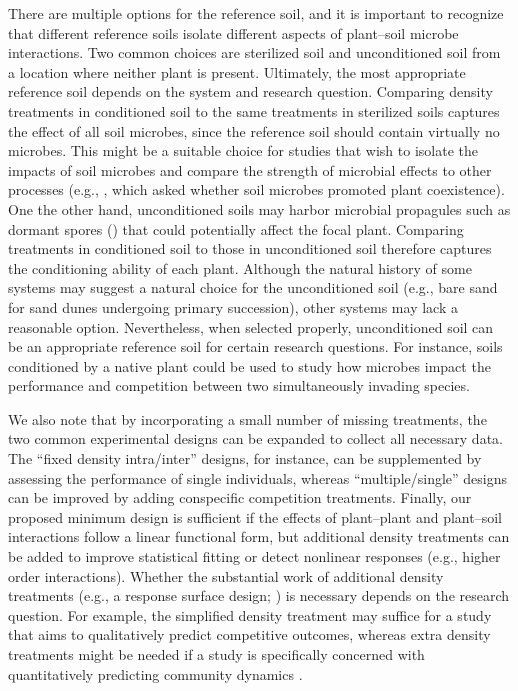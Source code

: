 There are multiple options for the reference soil, and it is important to recognize that different reference soils isolate different aspects of plant--soil microbe interactions. Two common choices are sterilized soil and unconditioned soil from a location where neither plant is present. Ultimately, the most appropriate reference soil depends on the system and research question.
Comparing density treatments in conditioned soil to the same treatments in sterilized soils captures the effect of all soil microbes, since the reference soil should contain virtually no microbes. This might be a suitable choice for studies that wish to isolate the impacts of soil microbes and compare the strength of microbial effects to other processes (e.g., \citealp{Chung2016}, which asked whether soil microbes promoted plant coexistence).
One the other hand, unconditioned soils may harbor microbial propagules such as dormant spores (\citealp{Lennon2011}) that could potentially affect the focal plant. Comparing treatments in conditioned soil to those in unconditioned soil therefore captures the conditioning ability of each plant.
Although the natural history of some systems may suggest a natural choice for the unconditioned soil (e.g., bare sand for sand dunes undergoing primary succession), other systems may lack a reasonable option. Nevertheless, when selected properly, unconditioned soil can be an appropriate reference soil for certain research questions. For instance, soils conditioned by a native plant could be used to study how microbes impact the performance and competition between two simultaneously invading species.
\par


We also note that by incorporating a small number of missing treatments, the two common experimental designs can be expanded to collect all necessary data. The ``fixed density intra/inter'' designs, for instance, can be supplemented by assessing the performance of single individuals, whereas ``multiple/single'' designs can be improved by adding conspecific competition treatments.
Finally, our proposed minimum design is sufficient if the effects of plant--plant and plant--soil interactions follow a linear functional form, but additional density treatments can be added to improve statistical fitting or detect nonlinear responses (e.g.,  higher order interactions).
Whether the substantial work of additional density treatments (e.g., a response surface design; \citealp{Inouye2001}) is necessary depends on the research question.
For example, the simplified density treatment may suffice for a study that aims to qualitatively predict competitive outcomes, whereas extra density treatments might be needed if a study is specifically concerned with quantitatively predicting community dynamics \citep{Hart2018, Letten2019}.
\par



